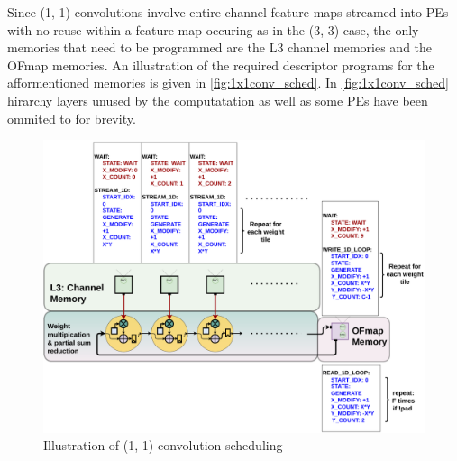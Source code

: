 Since (1, 1) convolutions involve entire channel feature maps streamed into PEs
with no reuse within a feature map occuring as in the (3, 3) case, the only
memories that need to be programmed are the L3 channel memories and the OFmap
memories. An illustration of the required descriptor programs for the
afformentioned memories is given in \autoref{fig:1x1conv_sched}. In
\autoref{fig:1x1conv_sched} hirarchy layers unused by the computatation 
as well as some PEs have been ommited to for brevity.

\begin{figure}[ht]
    \centering
    \includegraphics[scale=0.495]{fig/1x1conv_sched.pdf}
    \caption{Illustration of (1, 1) convolution scheduling}
    \label{fig:1x1conv_sched}
\end{figure}

